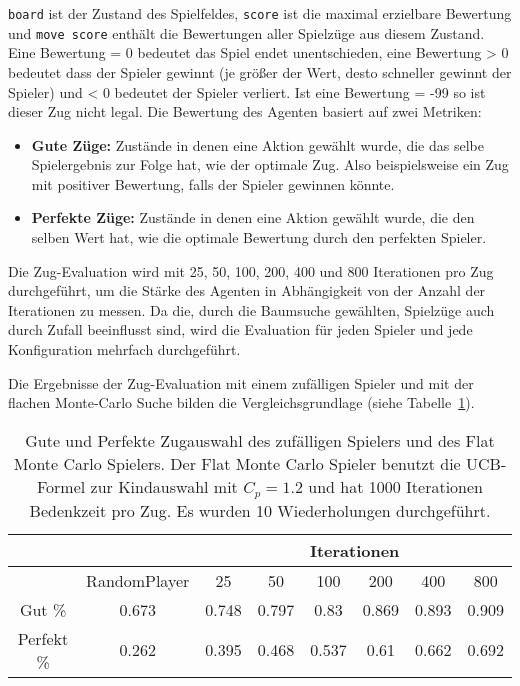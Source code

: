 \verb|board| ist der Zustand des Spielfeldes, \verb|score| ist die maximal erzielbare Bewertung und \verb|move score| enthält die Bewertungen aller Spielzüge aus diesem Zustand.
Eine Bewertung = 0 bedeutet das Spiel endet unentschieden, eine Bewertung > 0 bedeutet dass der Spieler gewinnt (je größer der Wert, desto schneller gewinnt der Spieler) und < 0 bedeutet der Spieler verliert.
Ist eine Bewertung = -99 so ist dieser Zug nicht legal.
Die Bewertung des Agenten basiert auf zwei Metriken:
\begin{itemize}
    \item \textbf{Gute Züge:} Zustände in denen eine Aktion gewählt wurde, die das selbe Spielergebnis zur Folge hat, wie der optimale Zug. Also beispielsweise ein Zug mit positiver Bewertung, falls der Spieler gewinnen könnte.
    \item \textbf{Perfekte Züge:} Zustände in denen eine Aktion gewählt wurde, die den selben Wert hat, wie die optimale Bewertung durch den perfekten Spieler.
\end{itemize}

Die Zug-Evaluation wird mit 25, 50, 100, 200, 400 und 800 Iterationen pro Zug durchgeführt, um die Stärke des Agenten in Abhängigkeit von der Anzahl der Iterationen zu messen.
Da die, durch die Baumsuche gewählten, Spielzüge auch durch Zufall beeinflusst sind, wird die Evaluation für jeden Spieler und jede Konfiguration mehrfach durchgeführt.

\bigskip
Die Ergebnisse der Zug-Evaluation mit einem zufälligen Spieler und mit der flachen Monte-Carlo Suche bilden die Vergleichsgrundlage (siehe Tabelle~\ref{tab:flat-mc-move-eval}).

\begin{table}[h!]
\centering
\begin{tabular}{|c||c|c|c|c|c|c|c|}
\cline{3-8}
\multicolumn{2}{c}{} & \multicolumn{6}{|c|}{Iterationen} \\
\hline
 & RandomPlayer & 25 & 50 & 100 & 200 & 400 & 800 \\
\hline
Gut \% & 0.673 & 0.748 & 0.797 & 0.83 & 0.869 & 0.893 & 0.909 \\
\hline
Perfekt \% & 0.262 & 0.395 & 0.468 & 0.537 & 0.61 & 0.662 & 0.692 \\
\hline
\end{tabular}
\caption{Gute und Perfekte Zugauswahl des zufälligen Spielers und des Flat Monte Carlo Spielers.
Der Flat Monte Carlo Spieler benutzt die UCB-Formel zur Kindauswahl mit $C_p=1.2$ und hat 1000 Iterationen Bedenkzeit pro Zug.
Es wurden 10 Wiederholungen durchgeführt.}
\label{tab:flat-mc-move-eval}
\end{table}

